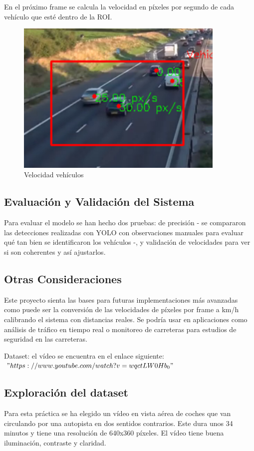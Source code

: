 En el próximo frame se calcula la velocidad en píxeles por segundo de cada vehículo que esté dentro de la ROI.
\begin{figure}[H]
    \centering
    \includegraphics[width = 10cm]{ImagenesLatex/im4.png}{}
    \caption{Velocidad vehículos}
    \label{fig:enter-label}
\end{figure}

\subsection{Evaluación y Validación del Sistema}
Para evaluar el modelo se han hecho dos pruebas: de precisión - se compararon las detecciones realizadas con YOLO con observaciones manuales para evaluar qué tan bien se identificaron los vehículos -, y validación de velocidades para ver si son coherentes y así ajustarlos.

\subsection{Otras Consideraciones}
Este proyecto sienta las bases para futuras implementaciones más avanzadas como puede ser la conversión de las velocidades de píxeles por frame a km/h calibrando el sistema con distancias reales. Se podría usar en aplicaciones como análisis de tráfico en tiempo real o monitoreo de carreteras para estudios de seguridad en las carreteras.


Dataset: el vídeo se encuentra en el enlace siguiente:
$"https://www.youtube.com/watch?v=wqctLW0Hb_0"$



\subsection{Exploración del dataset}
Para esta práctica se ha elegido un vídeo en vista aérea de coches que van circulando por una autopista en dos sentidos contrarios.  Este dura unos 34 minutos y tiene una resolución de 640x360 píxeles.
El vídeo tiene buena iluminación, contraste y claridad.


